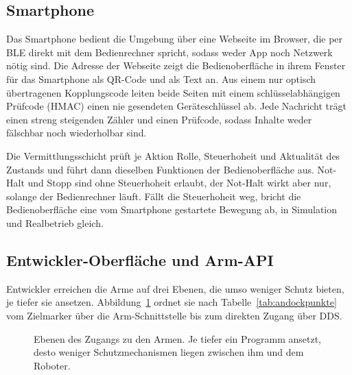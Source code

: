 \subsection{Smartphone}
\label{sec:smartphone}
Das Smartphone bedient die Umgebung über eine Webseite im Browser, die per \ac{BLE} direkt mit dem Bedienrechner spricht, sodass weder App noch Netzwerk nötig sind.
Die Adresse der Webseite zeigt die Bedienoberfläche in ihrem Fenster für das Smartphone als QR-Code und als Text an.
Aus einem nur optisch übertragenen Kopplungscode leiten beide Seiten mit einem schlüsselabhängigen Prüfcode (HMAC) einen nie gesendeten Geräteschlüssel ab.
Jede Nachricht trägt einen streng steigenden Zähler und einen Prüfcode, sodass Inhalte weder fälschbar noch wiederholbar sind.

Die Vermittlungsschicht prüft je Aktion Rolle, Steuerhoheit und Aktualität des Zustands und führt dann dieselben Funktionen der Bedienoberfläche aus.
Not-Halt und Stopp sind ohne Steuerhoheit erlaubt, der Not-Halt wirkt aber nur, solange der Bedienrechner läuft.
Fällt die Steuerhoheit weg, bricht die Bedienoberfläche eine vom Smartphone gestartete Bewegung ab, in Simulation und Realbetrieb gleich.

\subsection{Entwickler-Oberfläche und Arm-API}
\label{sec:entwickler_api}
Entwickler erreichen die Arme auf drei Ebenen, die umso weniger Schutz bieten, je tiefer sie ansetzen.
Abbildung~\ref{fig:api_ebenen} ordnet sie nach Tabelle~\ref{tab:andockpunkte} vom Zielmarker über die Arm-Schnittstelle bis zum direkten Zugang über DDS.

\begin{figure}[htbp]
  \centering
  
  \caption[Ebenen des Zugangs zu den Armen]{Ebenen des Zugangs zu den Armen. Je tiefer ein Programm ansetzt, desto weniger Schutzmechanismen liegen zwischen ihm und dem Roboter.}
  \label{fig:api_ebenen}
\end{figure}

